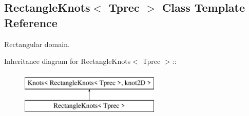 \hypertarget{classRectangleKnots}{
\subsection{RectangleKnots$<$ Tprec $>$ Class Template Reference}
\label{classRectangleKnots}
}
Rectangular domain.  


Inheritance diagram for RectangleKnots$<$ Tprec $>$::\begin{figure}[H]
\begin{center}
\leavevmode
\includegraphics[height=2cm]{classRectangleKnots}
\end{center}
\end{figure}
